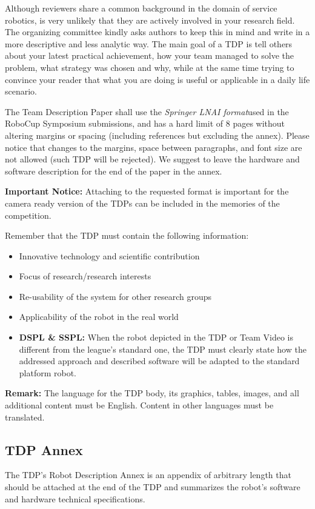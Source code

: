 \documentclass[runningheads,a4paper]{llncs}
\begin{document}
Although reviewers share a common background in the domain of service robotics, is very unlikely that they are actively involved in your research field. The organizing committee kindly asks authors to keep this in mind and write in a more descriptive and less analytic way. The main goal of a TDP is tell others about your latest practical achievement, how your team managed to solve the problem, what strategy was chosen and why, while at the same time trying to convince your reader that what you are doing is useful or applicable in a daily life scenario.

The Team Description Paper shall use the \textit{Springer LNAI format}\footnotemark used in the RoboCup Symposium submissions, and has a hard limit of 8 pages without altering margins or spacing (including references but excluding the annex). Please notice that changes to the margins, space between paragraphs, and font size are not allowed (such TDP will be rejected). We suggest to leave the hardware and software description for the end of the paper in the annex.

\textbf{Important Notice:} Attaching to the requested format is important for the camera ready version of the TDPs can be included in the memories of the competition.

Remember that the TDP must contain the following information:

\begin{itemize}
	\item Innovative technology and scientific contribution
	\item Focus of research/research interests
	\item Re-usability of the system for other research groups
	\item Applicability of the robot in the real world
	\item \textbf{DSPL \& SSPL:} When the robot depicted in the TDP or Team Video is different from the league's standard one, the TDP must clearly state how the addressed approach and described software will be adapted to the standard platform robot.
\end{itemize}

\textbf{Remark:} The language for the TDP body, its graphics, tables, images, and all additional content must be English. Content in other languages must be translated.

\subsection{TDP Annex}
The TDP's Robot Description Annex is an appendix of arbitrary length that should be attached at the end of the TDP and summarizes the robot's software and hardware technical specifications.
\end{document}
